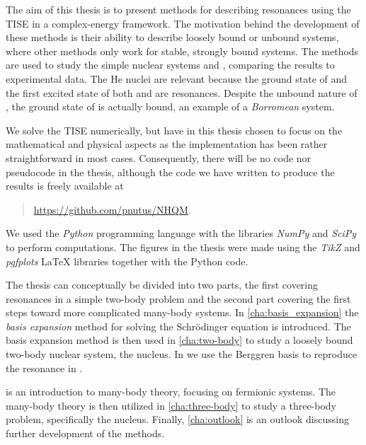 \documentclass[../main/report.tex]{subfiles}
\begin{document}
The aim of this thesis is to present methods for describing resonances using the TISE in a complex-energy framework.
The motivation behind the development of these methods is their ability to describe loosely bound or unbound systems, where other methods only work for stable, strongly bound systems.
The methods are used to study the simple nuclear systems  and , comparing the results to experimental data.
The He nuclei are relevant because the ground state of  and the first excited state of both  and  are resonances. 
Despite the unbound nature of , the ground state of  is actually bound, an example of a \emph{Borromean} system.

We solve the TISE numerically, but have in this thesis chosen to focus on the mathematical and physical aspects as the implementation has been rather straightforward in most cases.
Consequently, there will be no code nor pseudocode in the thesis, although the code we have written to produce the results is freely available at
\begin{quote}
  \url{https://github.com/pnutus/NHQM}.
\end{quote}
We used the \emph{Python} programming language with the libraries \emph{NumPy} and \emph{SciPy} to perform computations. 
The figures in the thesis were made using the \emph{TikZ} and \emph{pgfplots} LaTeX libraries together with the Python code.

The thesis can conceptually be divided into two parts, the first covering resonances in a simple two-body problem and the second part covering the first steps toward more complicated many-body systems. 
In \cref{cha:basis_expansion} the \emph{basis expansion} method for solving the Schrödinger equation is introduced.
The basis expansion method is then used in \cref{cha:two-body} to study a loosely bound two-body nuclear system, the  nucleus.
In  we use the Berggren basis to reproduce the resonance in .

 is an introduction to many-body theory, focusing on fermionic systems. 
The many-body theory is then utilized in \cref{cha:three-body} 
to study a three-body problem, specifically the  nucleus.  
Finally, \cref{cha:outlook} is an outlook discussing further development of the methods.
\end{document}
